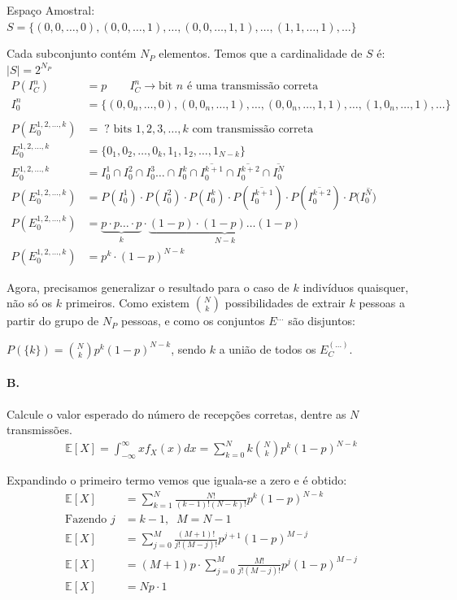 \documentclass{article}
\newcommand\ov[1]{\overline{#1}}
\begin{document}
Espaço Amostral: $S = \{(0,0,\ldots,0),(0,0,\ldots,1),\ldots,(0,0,\ldots,1,1),\ldots,(1,1,\ldots,1),\ldots\}$

Cada subconjunto contém $N_P$ elementos. Temos que a cardinalidade de $S$ é: $|S| = 2^{N_P}$
\begin{align*}
    P(I^n_C) &= p \qquad I^n_C \rightarrow \text{bit $n$ é uma transmissão correta} \\
    I^n_0 &= \{(0,0_n,\ldots,0),(0,0_n,\ldots,1),\ldots,(0,0_n,\ldots,1,1),\ldots,(1,0_n,\ldots,1),\ldots\} \\\\
    P(E^{1,2,\ldots,k}_0) &= \; ? \text{ bits } 1,2,3,\ldots,k \text{ com transmissão correta} \\
    E^{1,2,\ldots,k}_0 &= \{0_1,0_2,\ldots,0_k,1_1,1_2,\ldots,1_{N-k}\} \\
    E^{1,2,\ldots,k}_0 &= I_0^1 \cap I_0^2 \cap I_0^3 \ldots \cap I_0^k \cap \ov{I_0^{k+1}} \cap \ov{I_0^{k+2}} \cap \ov{I_0^{N}} \\
    P(E^{1,2,\ldots,k}_0) &= P(I_0^1) \cdot P(I_0^2) \cdot P(I_0^k) \cdot P(\ov{I_0^{k+1}}) \cdot
    P(\ov{I_0^{k+2}}) \cdot P(\ov{I_0^N)} \\
    P(E^{1,2,\ldots,k}_0) &= \underbrace{p \cdot p \ldots \cdot p}_{k} \cdot \underbrace{(1-p)
    \cdot (1-p) \ldots (1-p)}_{N-k} \\
    P(E^{1,2,\ldots,k}_0) &= p^k \cdot (1-p)^{N-k}
\end{align*}

Agora, precisamos generalizar o resultado para o caso de $k$ indivíduos quaisquer, não só os $k$
primeiros. Como existem ${N \choose k}$ possibilidades de extrair $k$ pessoas a partir do grupo de
$N_P$ pessoas, e como os conjuntos $E^{\ldots}$ são disjuntos:

$P(\{k\}) = {N \choose k} p^k (1-p)^{N-k}$, sendo $k$ a união de todos os $E^{(\ldots)}_C$.

\paragraph*{B.} Calcule o valor esperado do número de recepções corretas, dentre as $N$
transmissões.
\begin{align*}
    \mathbb{E}[X] = \int_{-\infty}^{\infty} x f_X(x)dx = \sum_{k=0}^{N} k {N \choose k} p^{k} (1-p)^{N-k}
\end{align*}

Expandindo o primeiro termo vemos que iguala-se a zero e é obtido:
\begin{align*}
    \mathbb{E}[X] &= \sum_{k=1}^{N} \frac{N!}{(k-1)!(N-k)!} p^{k} (1-p)^{N-k} \\
    \text{Fazendo } j &= k-1, \;\; M = N-1 \\
    \mathbb{E}[X] &= \sum_{j=0}^{M} \frac{(M+1)!}{j!(M-j)!} p^{j+1} (1-p)^{M-j} \\
    \mathbb{E}[X] &= (M+1)p \cdot \sum_{j=0}^{M} \frac{M!}{j!(M-j)!} p^{j} (1-p)^{M-j} \\
    \mathbb{E}[X] &= Np \cdot 1
\end{align*}
\end{document}

